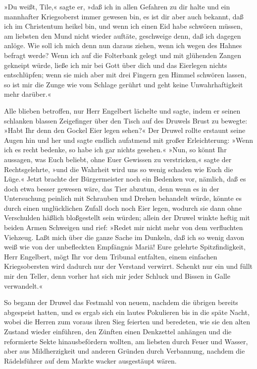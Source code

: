 »Du weißt, Tile,« sagte er, »daß ich in allen Gefahren zu dir halte
und ein mannhafter Kriegsoberst immer gewesen bin, es ist dir aber
auch bekannt, daß ich im Christentum heikel bin, und wenn ich einen
Eid habe schwören müssen, am liebsten den Mund nicht wieder
auftäte, geschweige denn, daß ich dagegen anlöge. Wie soll ich mich
denn nun daraus ziehen, wenn ich wegen des Hahnes befragt werde?
Wenn ich auf die Folterbank gelegt und mit glühenden Zangen
gekneipt würde, ließe ich mir bei Gott über dich und das Eierlegen
nichts entschlüpfen; wenn sie mich aber mit drei Fingern gen Himmel
schwören lassen, so ist mir die Zunge wie vom Schlage gerührt und
geht keine Unwahrhaftigkeit mehr darüber.«

\pagenum{[21]}Alle blieben betroffen, nur Herr Engelbert lächelte
und sagte, indem er seinen schlanken blassen Zeigefinger über den
Tisch auf des Druwels Brust zu bewegte: »Habt Ihr denn den Gockel
Eier legen sehen?« Der Druwel rollte erstaunt seine Augen hin und
her und sagte endlich aufatmend mit großer Erleichterung: »Wenn ich
es recht bedenke, so habe ich gar nichts gesehen.« »Nun, so könnt
Ihr aussagen, was Euch beliebt, ohne Euer Gewissen zu verstricken,«
sagte der Rechtsgelehrte, »und die Wahrheit wird uns so wenig
schaden wie Euch die Lüge.« Jetzt brachte der Bürgermeister noch
ein Bedenken vor, nämlich, daß es doch etwa besser gewesen wäre,
das Tier abzutun, denn wenn es in der Untersuchung peinlich mit
Schrauben und Drehen behandelt würde, könnte es durch einen
unglücklichen Zufall doch noch Eier legen, wodurch sie dann ohne
Verschulden häßlich bloßgestellt sein würden; allein der Druwel
winkte heftig mit beiden Armen Schweigen und rief: »Redet mir nicht
mehr von dem verfluchten Viehzeug. Laßt mich über die ganze Sache
im Dunkeln, daß ich so wenig davon weiß wie von der unbefleckten
Empfängnis Mariä! Eure gelehrte Spitzfindigkeit, Herr Engelbert,
mögt Ihr vor dem Tribunal entfalten, einem einfachen Kriegsobersten
wird dadurch nur der Verstand verwirrt. Schenkt nur ein und füllt
mir den Teller, denn vorher hat sich mir jeder Schluck und Bissen
in Galle verwandelt.«

So begann der Druwel das Festmahl von neuem, nachdem die übrigen
bereits abgespeist hatten, und es ergab sich ein lautes Pokulieren
bis in die späte Nacht, wobei die Herren zum voraus ihren Sieg
feierten und beredeten, wie sie den alten Zustand wieder einführen,
den Zünften einen Denkzettel anhängen und die reformierte Sekte
\pagenum{[22]}hinausbefördern wollten, am liebsten durch Feuer und
Wasser, aber aus Mildherzigkeit und anderen Gründen durch
Verbannung, nachdem die Rädelsführer auf dem Markte wacker
ausgestäupt wären.

